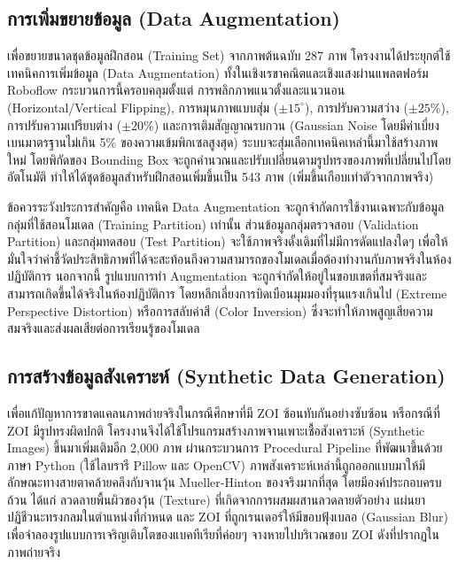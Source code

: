 \subsection{การเพิ่มขยายข้อมูล (Data Augmentation)}

เพื่อขยายขนาดชุดข้อมูลฝึกสอน (Training Set) จากภาพต้นฉบับ 287 ภาพ โครงงานได้ประยุกต์ใช้เทคนิคการเพิ่มข้อมูล (Data Augmentation) ทั้งในเชิงเรขาคณิตและเชิงแสงผ่านแพลตฟอร์ม Roboflow \cite{roboflow} กระบวนการนี้ครอบคลุมตั้งแต่ การพลิกภาพแนวตั้งและแนวนอน (Horizontal/Vertical Flipping), การหมุนภาพแบบสุ่ม ($\pm 15^\circ$), การปรับความสว่าง ($\pm 25\%$), การปรับความเปรียบต่าง ($\pm 20\%$) และการเติมสัญญาณรบกวน (Gaussian Noise โดยมีค่าเบี่ยงเบนมาตรฐานไม่เกิน 5\% ของความเข้มพิกเซลสูงสุด) ระบบจะสุ่มเลือกเทคนิคเหล่านี้มาใช้สร้างภาพใหม่ โดยพิกัดของ Bounding Box จะถูกคำนวณและปรับเปลี่ยนตามรูปทรงของภาพที่เปลี่ยนไปโดยอัตโนมัติ ทำให้ได้ชุดข้อมูลสำหรับฝึกสอนเพิ่มขึ้นเป็น 543 ภาพ (เพิ่มขึ้นเกือบเท่าตัวจากภาพจริง)

ข้อควรระวังประการสำคัญคือ เทคนิค Data Augmentation จะถูกจำกัดการใช้งานเฉพาะกับข้อมูลกลุ่มที่ใช้สอนโมเดล (Training Partition) เท่านั้น ส่วนข้อมูลกลุ่มตรวจสอบ (Validation Partition) และกลุ่มทดสอบ (Test Partition) จะใช้ภาพจริงดั้งเดิมที่ไม่มีการดัดแปลงใดๆ เพื่อให้มั่นใจว่าค่าชี้วัดประสิทธิภาพที่ได้จะสะท้อนถึงความสามารถของโมเดลเมื่อต้องทำงานกับภาพจริงในห้องปฏิบัติการ นอกจากนี้ รูปแบบการทำ Augmentation จะถูกจำกัดให้อยู่ในขอบเขตที่สมจริงและสามารถเกิดขึ้นได้จริงในห้องปฏิบัติการ โดยหลีกเลี่ยงการบิดเบือนมุมมองที่รุนแรงเกินไป (Extreme Perspective Distortion) หรือการสลับค่าสี (Color Inversion) ซึ่งจะทำให้ภาพสูญเสียความสมจริงและส่งผลเสียต่อการเรียนรู้ของโมเดล

\subsection{การสร้างข้อมูลสังเคราะห์ (Synthetic Data Generation)}

เพื่อแก้ปัญหาการขาดแคลนภาพถ่ายจริงในกรณีศึกษาที่มี ZOI ซ้อนทับกันอย่างซับซ้อน หรือกรณีที่ ZOI มีรูปทรงผิดปกติ โครงงานจึงได้ใช้โปรแกรมสร้างภาพจานเพาะเชื้อสังเคราะห์ (Synthetic Images) ขึ้นมาเพิ่มเติมอีก 2,000 ภาพ ผ่านกระบวนการ Procedural Pipeline ที่พัฒนาขึ้นด้วยภาษา Python (ใช้ไลบรารี Pillow และ OpenCV) ภาพสังเคราะห์เหล่านี้ถูกออกแบบมาให้มีลักษณะทางสายตาคล้ายคลึงกับจานวุ้น Mueller-Hinton ของจริงมากที่สุด โดยมีองค์ประกอบครบถ้วน ได้แก่ ลวดลายพื้นผิวของวุ้น (Texture) ที่เกิดจากการผสมผสานลวดลายตัวอย่าง แผ่นยาปฏิชีวนะทรงกลมในตำแหน่งที่กำหนด และ ZOI ที่ถูกเรนเดอร์ให้มีขอบฟุ้งเบลอ (Gaussian Blur) เพื่อจำลองรูปแบบการเจริญเติบโตของแบคทีเรียที่ค่อยๆ จางหายไปบริเวณขอบ ZOI ดังที่ปรากฏในภาพถ่ายจริง

